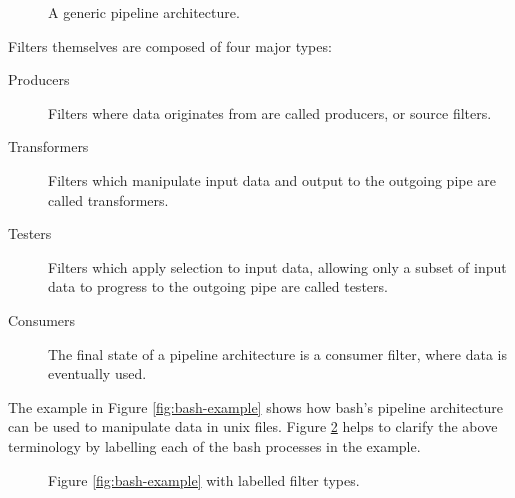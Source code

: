 \begin{figure}[ht]
    \centering
{}
\caption{A generic pipeline architecture.}
\label{fig:pipe-filter}
\end{figure}

\noindent Filters themselves are composed of four major types:

\begin{description}
    \item[Producers] Filters where data originates from are called producers, or source filters.
    \item[Transformers] Filters which manipulate input data and output to the outgoing pipe are called transformers.
    \item[Testers] Filters which apply selection to input data, allowing only a subset of input data to progress to the outgoing pipe are called testers.
    \item[Consumers] The final state of a pipeline architecture is a consumer filter, where data is eventually used.
\end{description}

The example in Figure \ref{fig:bash-example} shows how bash's pipeline architecture can be used to manipulate data in unix files.
Figure \ref{fig:bash-example-labelled} helps to clarify the above terminology by labelling each of the bash processes in the example.

\begin{figure}[H]
    \centering
{}
\caption{Figure \ref{fig:bash-example} with labelled filter types.}
\label{fig:bash-example-labelled}
\end{figure}

